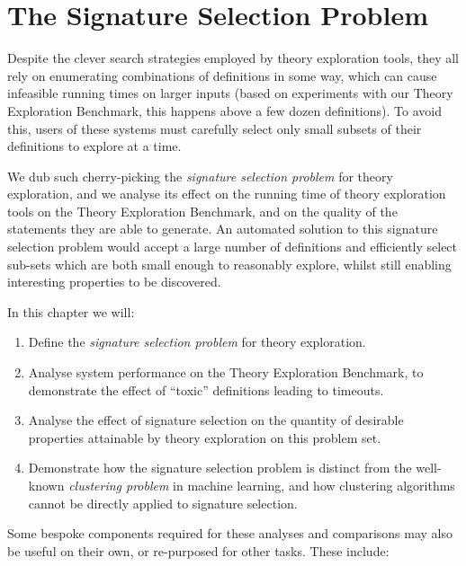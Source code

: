 \chapter{The Signature Selection Problem}
\label{sec:signatureselection}

Despite the clever search strategies employed by theory exploration tools, they
all rely on enumerating combinations of definitions in some way, which can cause
infeasible running times on larger inputs (based on experiments with our Theory
Exploration Benchmark,%
this happens above a few dozen
definitions). To avoid this, users of these systems must carefully select only
small subsets of their definitions to explore at a time.

We dub such cherry-picking the \emph{signature selection problem} for theory
exploration, and we analyse its effect on the running time of theory exploration
tools on the Theory Exploration Benchmark, and on the quality of the statements
they are able to generate. An automated solution to this signature selection
problem would accept a large number of definitions and efficiently select
sub-sets which are both small enough to reasonably explore, whilst still
enabling interesting properties to be discovered.

In this chapter we will:

\begin{enumerate}
  \item Define the \emph{signature selection problem} for theory exploration.
  \item Analyse system performance on the Theory Exploration Benchmark, to
    demonstrate the effect of ``toxic'' definitions leading to timeouts.
  \item Analyse the effect of signature selection on the quantity of desirable
    properties attainable by theory exploration on this problem set.
  \item Demonstrate how the signature selection problem is distinct from the
    well-known \emph{clustering problem} in machine learning, and how clustering
    algorithms cannot be directly applied to signature selection.
\end{enumerate}

\iffalse
Some bespoke components required for these analyses and comparisons may also be
useful on their own, or re-purposed for other tasks. These include:

